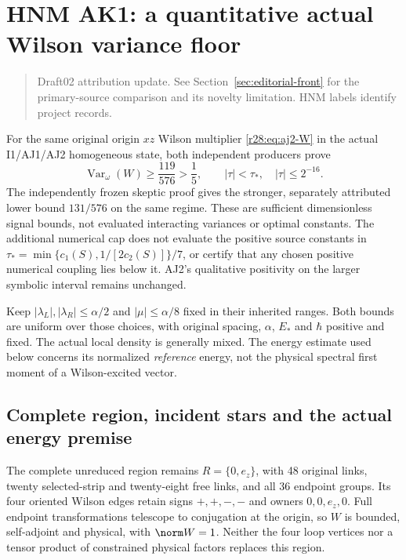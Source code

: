 \section{HNM AK1: a quantitative actual Wilson variance floor\workstar}
\begin{quote}\small Draft02 attribution update. See Section~\ref{sec:editorial-front} for the primary-source comparison and its novelty limitation. HNM labels identify project records.\end{quote}
\label{r28:sec:ak1}
For the same original origin $xz$ Wilson multiplier \eqref{r28:eq:aj2-W} in the actual I1/AJ1/AJ2 homogeneous state, both independent producers prove
\begin{equation}
 \operatorname{Var}_{\omega}(W)\ge\frac{119}{576}>\frac15,
 \qquad |\tau|<\tau_*,\quad |\tau|\le2^{-16}.
 \label{r28:eq:ak1-common}
\end{equation}
The independently frozen skeptic proof gives the stronger, separately attributed lower bound $131/576$ on the same regime. These are sufficient dimensionless signal bounds, not evaluated interacting variances or optimal constants. The additional numerical cap does not evaluate the positive source constants in $\tau_*=\min\{c_1(S),1/[2c_2(S)]\}/7$, or certify that any chosen positive numerical coupling lies below it. AJ2's qualitative positivity on the larger symbolic interval remains unchanged.

Keep $|\lambda_L|,|\lambda_R|\le\alpha/2$ and $|\mu|\le\alpha/8$ fixed in their inherited ranges. Both bounds are uniform over those choices, with original spacing, $\alpha$, $E_*$ and $\hbar$ positive and fixed. The actual local density is generally mixed. The energy estimate used below concerns its normalized \emph{reference} energy, not the physical spectral first moment of a Wilson-excited vector.

\subsection{Complete region, incident stars and the actual energy premise}
The complete unreduced region remains $R=\{0,e_z\}$, with 48 original links, twenty selected-strip and twenty-eight free links, and all 36 endpoint groups. Its four oriented Wilson edges retain signs $+,+,-,-$ and owners $0,0,e_z,0$. Full endpoint transformations telescope to conjugation at the origin, so $W$ is bounded, self-adjoint and physical, with $\norm W=1$. Neither the four loop vertices nor a tensor product of constrained physical factors replaces this region.

